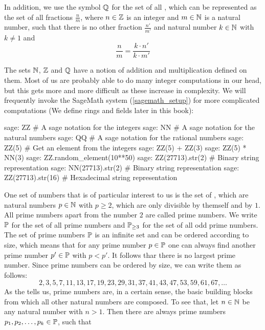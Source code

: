 In addition, we use the symbol $\mathbb{Q}$ for the set of all , which can be represented as the set of all fractions $\frac{n}{m}$, where $n\in \mathbb{Z}$ is an integer and $m\in \mathbb{N}$ is a natural number, such that there is no other fraction $\frac{n'}{m'}$ and natural number $k\in \mathbb{N}$ with $k\neq 1$ and
\begin{equation}
\frac{n}{m} = \frac{k\cdot n'}{k\cdot m'}
\end{equation}

The sets $\mathbb{N}$, $\mathbb{Z}$ and $\mathbb{Q}$ have a notion of addition and multiplication defined on them. Most of us are probably able to do many integer computations in our head, but this gets more and more difficult as these increase in complexity.  We will frequently invoke the SageMath system (\ref{sagemath_setup}) for more complicated computations (We define rings and fields later in this book):
\begin{sagecommandline}
sage: ZZ # A sage notation for the integers
sage: NN # A sage notation for the natural numbers
sage: QQ # A sage notation for the rational numbers
sage: ZZ(5) # Get an element from the integers
sage: ZZ(5) + ZZ(3)
sage: ZZ(5) * NN(3)
sage: ZZ.random_element(10**50)
sage: ZZ(27713).str(2) # Binary string representation
sage: NN(27713).str(2) # Binary string representation
sage: ZZ(27713).str(16) # Hexadecimal string representation
\end{sagecommandline}
One set of numbers that is of particular interest to us is the set of , which are natural numbers $ p \in \mathbb{N} $ with $ p \geq 2 $, which are only divisible by themself and by $1$. All prime numbers apart from the number $ 2 $ are called  prime numbers. We write $ \mathbb{P} $ for the set of all prime numbers and $ \mathbb{P} _{\geq 3} $ for the set of all odd prime numbers. The set of prime numbers $\mathbb{P}$ is an infinite set and can be ordered according to size, which means that for any prime number $p\in\mathbb{P}$ one can always find another prime number $p'\in\mathbb{P}$ with $p<p'$. It follows thar there is no largest prime number. Since prime numbers can be ordered by size, we can write them as follows:
\begin{equation}
\label{eq: primenumber_sequence}
2, 3, 5, 7, 11, 13, 17, 19, 23, 29, 31, 37, 41, 43, 47, 53, 59, 61, 67, \ldots
\end{equation}
As the  tells us, prime numbers are, in a certain sense, the basic building blocks from which all other natural numbers are composed. To see that, let $ n \in \mathbb{N} $ be any natural number with $n>1$. Then there are always prime numbers $ p_1, p_2, \ldots, p_k \in \mathbb{P} $, such that
